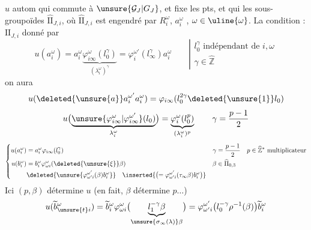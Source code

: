$u$ autom  qui commute à $\unsure{\mathcal G_J|G_J}$, et fixe les pts,
et qui   les sous-groupoïdes $\widehat{\mathrm{II}}_{J,i}$, où $\widehat{\mathrm{II}}_{J,i}$ est engendré par $R_i^\omega$, $a_i^\omega$ \unsure{$\in$}, $\omega\in\uline{\omega}$. La condition : $\mathrm{II}_{J,i}$  donné par
\[
u(a_i^\omega)=a_i^\omega\underbrace{\varphi_{i\infty}^\omega(l_0^\gamma)}_{(\lambda_i^\omega)^\gamma}
=\varphi_i^{\omega'}(l_\infty^\gamma)a_i^\omega
\qquad\left|\begin{array}{l}l_0^\gamma\text{ indépendant de }i,\omega\\\gamma\in\widehat{\mathbb Z}\end{array}\right.
\]
on aura
\[
u(\deleted{\unsure{a}}a_i^{\omega'}a_i^\omega)=\varphi_{i\infty}(l_0^{2\gamma}\deleted{\unsure{1}}l_0)
\]
\[
u\bigl(\underbrace{\unsure{\varphi_{i\infty}^{\omega}|\varphi_{i\infty}^{\omega'}}(l_0)}_{\lambda_i^\omega}\bigr)
=\underbrace{\varphi_i^\omega(l_0^p)}_{(\lambda_i^\omega)^p}
\qquad\gamma=\frac{p-1}{2}
\]
\[
\left\{\begin{aligned}
u(a_i^\omega)&=a_i^\omega\varphi_{i\infty}(l_0^\gamma)
&\gamma&=\frac{p-1}{2}\quad p\in\widehat{\mathbb Z}^{*}\text{ multiplicateur}\\
u(b_i^\omega)&=b_i^\omega\varphi_{\omega i}^\omega(\deleted{\unsure{\xi}}\beta)
&\beta&\in\widehat\Pi_{0,3}\\
&\deleted{\unsure{\varphi_{\omega'i}^{\omega'}(\beta)b_i^\omega}}\quad
\inserted{\bigl(=\varphi_{\omega'i}^{\omega'}(\tau_\infty\beta)b_i^\omega\bigr)}
\end{aligned}\right.
\]
Ici  $(p,\beta)$ détermine $u$ (en fait, $\beta$ détermine $p\ldots$)
\[
u(\widetilde b_{\unsure{t}i}^\omega)=\widetilde b_i^\omega\varphi_{\omega i}^\omega
\bigl(\underbrace{l_1^{-\gamma}\beta}_{\unsure{\sigma_\infty(\lambda)}\beta}\bigr)
=\varphi_{\omega'i}^{\omega'}\bigl(l_0^{-\gamma}\rho^{-1}(\beta)\bigr)\widetilde b_i^\omega
\]
